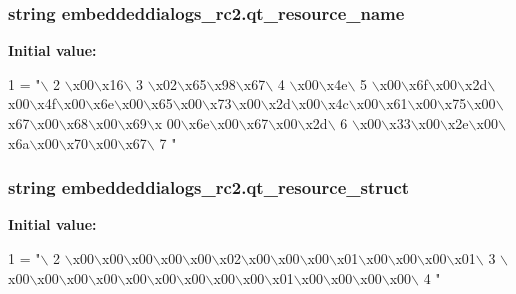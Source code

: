 \subsubsection[{qt\+\_\+resource\+\_\+name}]{\setlength{\rightskip}{0pt plus 5cm}string embeddeddialogs\+\_\+rc2.\+qt\+\_\+resource\+\_\+name}\label{namespaceembeddeddialogs__rc2_af8b002bf9fc82a8e12d096113d95e8ed}
{\bfseries Initial value\+:}
\begin{DoxyCode}
1 = \textcolor{stringliteral}{"\(\backslash\)}
2 \textcolor{stringliteral}{\(\backslash\)x00\(\backslash\)x16\(\backslash\)}
3 \textcolor{stringliteral}{\(\backslash\)x02\(\backslash\)x65\(\backslash\)x98\(\backslash\)x67\(\backslash\)}
4 \textcolor{stringliteral}{\(\backslash\)x00\(\backslash\)x4e\(\backslash\)}
5 \textcolor{stringliteral}{\(\backslash\)x00\(\backslash\)x6f\(\backslash\)x00\(\backslash\)x2d\(\backslash\)x00\(\backslash\)x4f\(\backslash\)x00\(\backslash\)x6e\(\backslash\)x00\(\backslash\)x65\(\backslash\)x00\(\backslash\)x73\(\backslash\)x00\(\backslash\)x2d\(\backslash\)x00\(\backslash\)x4c\(\backslash\)x00\(\backslash\)x61\(\backslash\)x00\(\backslash\)x75\(\backslash\)x00\(\backslash\)x67\(\backslash\)x00\(\backslash\)x68\(\backslash\)x00\(\backslash\)x69\(\backslash\)x
      00\(\backslash\)x6e\(\backslash\)x00\(\backslash\)x67\(\backslash\)x00\(\backslash\)x2d\(\backslash\)}
6 \textcolor{stringliteral}{\(\backslash\)x00\(\backslash\)x33\(\backslash\)x00\(\backslash\)x2e\(\backslash\)x00\(\backslash\)x6a\(\backslash\)x00\(\backslash\)x70\(\backslash\)x00\(\backslash\)x67\(\backslash\)}
7 \textcolor{stringliteral}{"}
\end{DoxyCode}
\hypertarget{namespaceembeddeddialogs__rc2_adb9bd0c8228bc8abfa6e27c3cb5659e5}{}
\subsubsection[{qt\+\_\+resource\+\_\+struct}]{\setlength{\rightskip}{0pt plus 5cm}string embeddeddialogs\+\_\+rc2.\+qt\+\_\+resource\+\_\+struct}\label{namespaceembeddeddialogs__rc2_adb9bd0c8228bc8abfa6e27c3cb5659e5}
{\bfseries Initial value\+:}
\begin{DoxyCode}
1 = \textcolor{stringliteral}{"\(\backslash\)}
2 \textcolor{stringliteral}{\(\backslash\)x00\(\backslash\)x00\(\backslash\)x00\(\backslash\)x00\(\backslash\)x00\(\backslash\)x02\(\backslash\)x00\(\backslash\)x00\(\backslash\)x00\(\backslash\)x01\(\backslash\)x00\(\backslash\)x00\(\backslash\)x00\(\backslash\)x01\(\backslash\)}
3 \textcolor{stringliteral}{\(\backslash\)x00\(\backslash\)x00\(\backslash\)x00\(\backslash\)x00\(\backslash\)x00\(\backslash\)x00\(\backslash\)x00\(\backslash\)x00\(\backslash\)x00\(\backslash\)x01\(\backslash\)x00\(\backslash\)x00\(\backslash\)x00\(\backslash\)x00\(\backslash\)}
4 \textcolor{stringliteral}{"}
\end{DoxyCode}
